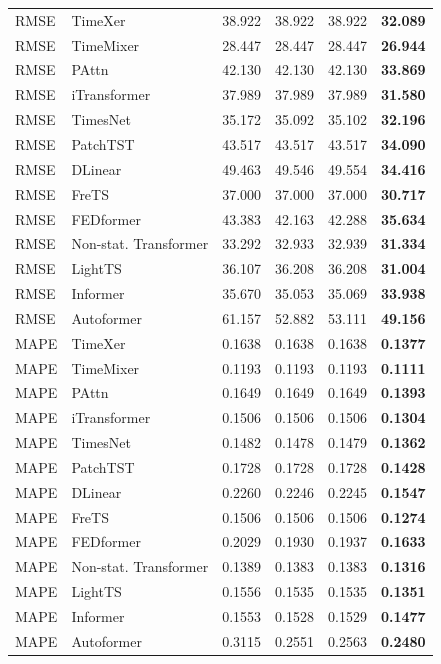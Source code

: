 \begin{longtable}{llrrrr}
\midrule
RMSE & TimeXer & 38.922 & 38.922 & 38.922 & \textbf{32.089} \\
RMSE & TimeMixer & 28.447 & 28.447 & 28.447 & \textbf{26.944} \\
RMSE & PAttn & 42.130 & 42.130 & 42.130 & \textbf{33.869} \\
RMSE & iTransformer & 37.989 & 37.989 & 37.989 & \textbf{31.580} \\
RMSE & TimesNet & 35.172 & 35.092 & 35.102 & \textbf{32.196} \\
RMSE & PatchTST & 43.517 & 43.517 & 43.517 & \textbf{34.090} \\
RMSE & DLinear & 49.463 & 49.546 & 49.554 & \textbf{34.416} \\
RMSE & FreTS & 37.000 & 37.000 & 37.000 & \textbf{30.717} \\
RMSE & FEDformer & 43.383 & 42.163 & 42.288 & \textbf{35.634} \\
RMSE & Non-stat. Transformer & 33.292 & 32.933 & 32.939 & \textbf{31.334} \\
RMSE & LightTS & 36.107 & 36.208 & 36.208 & \textbf{31.004} \\
RMSE & Informer & 35.670 & 35.053 & 35.069 & \textbf{33.938} \\
RMSE & Autoformer & 61.157 & 52.882 & 53.111 & \textbf{49.156} \\
\midrule
MAPE & TimeXer & 0.1638 & 0.1638 & 0.1638 & \textbf{0.1377} \\
MAPE & TimeMixer & 0.1193 & 0.1193 & 0.1193 & \textbf{0.1111} \\
MAPE & PAttn & 0.1649 & 0.1649 & 0.1649 & \textbf{0.1393} \\
MAPE & iTransformer & 0.1506 & 0.1506 & 0.1506 & \textbf{0.1304} \\
MAPE & TimesNet & 0.1482 & 0.1478 & 0.1479 & \textbf{0.1362} \\
MAPE & PatchTST & 0.1728 & 0.1728 & 0.1728 & \textbf{0.1428} \\
MAPE & DLinear & 0.2260 & 0.2246 & 0.2245 & \textbf{0.1547} \\
MAPE & FreTS & 0.1506 & 0.1506 & 0.1506 & \textbf{0.1274} \\
MAPE & FEDformer & 0.2029 & 0.1930 & 0.1937 & \textbf{0.1633} \\
MAPE & Non-stat. Transformer & 0.1389 & 0.1383 & 0.1383 & \textbf{0.1316} \\
MAPE & LightTS & 0.1556 & 0.1535 & 0.1535 & \textbf{0.1351} \\
MAPE & Informer & 0.1553 & 0.1528 & 0.1529 & \textbf{0.1477} \\
MAPE & Autoformer & 0.3115 & 0.2551 & 0.2563 & \textbf{0.2480} \\
\end{longtable}
\endgroup

